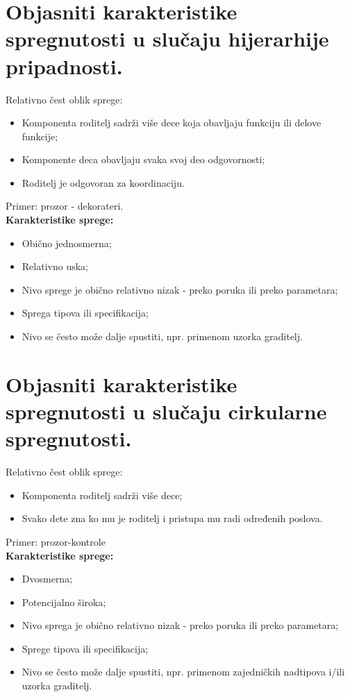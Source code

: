 \documentclass[a4paper]{article}
\begin{document}
\section{Objasniti karakteristike spregnutosti u slučaju hijerarhije pripadnosti.}
\noindent Relativno čest oblik sprege:
  \begin{itemize}
    \item Komponenta roditelj sadrži više dece koja obavljaju funkciju ili delove funkcije;
    \item Komponente deca obavljaju svaka svoj deo odgovornosti;
    \item Roditelj je odgovoran za koordinaciju.
  \end{itemize}
Primer: prozor - dekorateri.\\
\textbf{Karakteristike sprege:}
  \begin{itemize}
    \item Obično jednosmerna;
    \item Relativno uska;
    \item Nivo sprege je obično relativno nizak - preko poruka ili preko parametara;
    \item Sprega tipova ili specifikacija;
    \item Nivo se često može dalje spustiti, npr. primenom uzorka graditelj.
  \end{itemize}

\section{Objasniti karakteristike spregnutosti u slučaju cirkularne spregnutosti.}
\noindent Relativno čest oblik sprege:
  \begin{itemize}
    \item Komponenta roditelj sadrži više dece;
    \item Svako dete zna ko mu je roditelj i pristupa mu radi određenih poslova.
  \end{itemize}
  Primer: prozor-kontrole\\
  \textbf{Karakteristike sprege:}
  \begin{itemize}
    \item Dvosmerna;
    \item Potencijalno široka;
    \item Nivo sprega je obično relativno nizak - preko poruka ili preko parametara;
    \item Sprege tipova ili specifikacija;
    \item Nivo se često može dalje spustiti, npr. primenom zajedničkih nadtipova 
          i/ili uzorka graditelj.
  \end{itemize}
\end{document}
